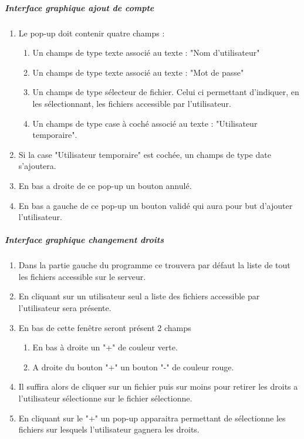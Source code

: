 \documentclass[10pt,a4paper]{report}
\begin{document}
	\subparagraph{Interface graphique ajout de compte}\label{add} 
		\begin{enumerate}
			\item Le pop-up doit contenir quatre champs :
			\begin{enumerate}[label=\arabic*.]
				\item Un champs de type texte associé au texte : "Nom d'utilisateur"
				\item Un champs de type texte associé au texte : "Mot de passe"
				\item Un champs de type sélecteur de fichier. Celui ci permettant d'indiquer, en les sélectionnant, les fichiers accessible par l'utilisateur.
				\item Un champs de type case à coché associé au texte : "Utilisateur temporaire".
			\end{enumerate}
			\item Si la case "Utilisateur temporaire" est cochée, un champs de type date s'ajoutera.
			\item En bas a droite de ce pop-up un bouton annulé.
			\item En bas a gauche de ce pop-up un bouton validé qui aura pour but d'ajouter l'utilisateur.
		\end{enumerate}
		
	\subparagraph{Interface graphique changement droits}\label{chg} 
		\begin{enumerate}
			\item Dans la partie gauche du programme ce trouvera par défaut la liste de tout les fichiers accessible sur le serveur.
			\item En cliquant sur un utilisateur seul a liste des fichiers accessible par l'utilisateur sera présente.
			\item En bas de cette fenêtre seront présent 2 champs
				\begin{enumerate}[label=\arabic*.]
					\item En bas à droite un "+" de couleur verte.
					\item A droite du bouton "+" un bouton "-" de couleur rouge.
				\end{enumerate}
			\item Il suffira alors de cliquer sur un fichier puis sur moins pour retirer les droits a l'utilisateur sélectionne sur le fichier sélectionne.
			\item En cliquant sur le "+" un pop-up apparaitra permettant de sélectionne les fichiers sur lesquels l'utilisateur gagnera les droits.
		\end{enumerate}
	
\end{document}
